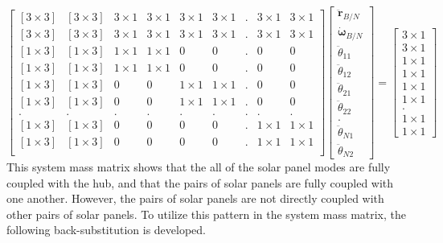 \documentclass[paper]{aiaaNew}
\begin{document}
	\begin{equation}
	\begin{bmatrix}
	[3\times 3] & [3\times 3] & 3\times 1 & 3\times 1 & 3\times 1 & 3\times 1 & . & 3\times 1 & 3\times 1\\
	[3\times 3] & [3\times 3] & 3\times 1 & 3\times 1 & 3\times 1 & 3\times 1 & . & 3\times 1 & 3\times 1\\
	[1\times 3] & [1\times 3] & 1\times 1 & 1\times 1  & 0 & 0 & . & 0 & 0\\
	[1\times 3] & [1\times 3] & 1\times 1 & 1\times 1  & 0 & 0 & . & 0 & 0\\
	[1\times 3] & [1\times 3] & 0 & 0  & 1\times 1 & 1\times 1 & . & 0 & 0 \\
	[1\times 3] & [1\times 3] & 0 & 0  & 1\times 1 & 1\times 1 & . & 0 & 0\\
	. & . & . & . & . & . & . & . & .\\
	[1\times 3] & [1\times 3] & 0 & 0  & 0 & 0 & . & 1\times 1 & 1\times 1\\
	[1\times 3] & [1\times 3] & 0 & 0  & 0 & 0 & . & 1\times 1 & 1\times 1\\
	\end{bmatrix}
	\begin{bmatrix}
	\ddot{\boldsymbol{r}}_{B/N}\\
	\dot{\boldsymbol{\omega}}_{B/N}\\
	\ddot{\theta}_{11}\\
	\ddot{\theta}_{12}\\
	\ddot{\theta}_{21}\\
	\ddot{\theta}_{22}\\
	.\\
	\ddot{\theta}_{N1}\\
	\ddot{\theta}_{N2}
	\end{bmatrix}
	=
	\begin{bmatrix}
	3\times 1\\
	3\times 1\\
	1\times 1\\
	1\times 1\\
	1\times 1\\
	1\times 1\\
	.\\
	1\times 1\\
	1\times 1
	\end{bmatrix}
	\end{equation}
	This system mass matrix shows that the all of the solar panel modes are fully coupled with the hub, and that the pairs of solar panels are fully coupled with one another. However, the pairs of solar panels are not directly coupled with other pairs of solar panels. To utilize this pattern in the system mass matrix, the following back-substitution is developed. 
	
\end{document}
